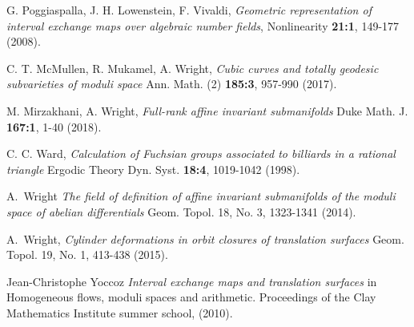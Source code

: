 \documentclass[a4paper,12pt]{article}
\begin{document}
\begin{thebibliography}{sage-flatsurf}
G. Poggiaspalla, J. H. Lowenstein, F. Vivaldi,
\textit{Geometric representation of interval exchange maps over algebraic number fields},
Nonlinearity \textbf{21:1}, 149-177 (2008).

C. T. McMullen, R. Mukamel, A. Wright,
\textit{Cubic curves and totally geodesic subvarieties of moduli space}
Ann. Math. (2) \textbf{185:3}, 957-990 (2017).

M. Mirzakhani, A. Wright,
\textit{Full-rank affine invariant submanifolds}
Duke Math. J. \textbf{167:1}, 1-40 (2018).

C. C. Ward,
\textit{Calculation of Fuchsian groups associated to billiards in a rational triangle}
Ergodic Theory Dyn. Syst. \textbf{18:4}, 1019-1042 (1998).

A.~Wright
\textit{The field of definition of affine invariant submanifolds of the moduli space of abelian differentials}
Geom. Topol. 18, No. 3, 1323-1341 (2014).

A.~Wright,
\textit{Cylinder deformations in orbit closures of translation surfaces}
Geom. Topol. 19, No. 1, 413-438 (2015).

Jean-Christophe Yoccoz
\textit{Interval exchange maps and translation surfaces}
in Homogeneous flows, moduli spaces and arithmetic.
Proceedings of the Clay Mathematics Institute summer school,
(2010).
\end{thebibliography}
\end{document}
